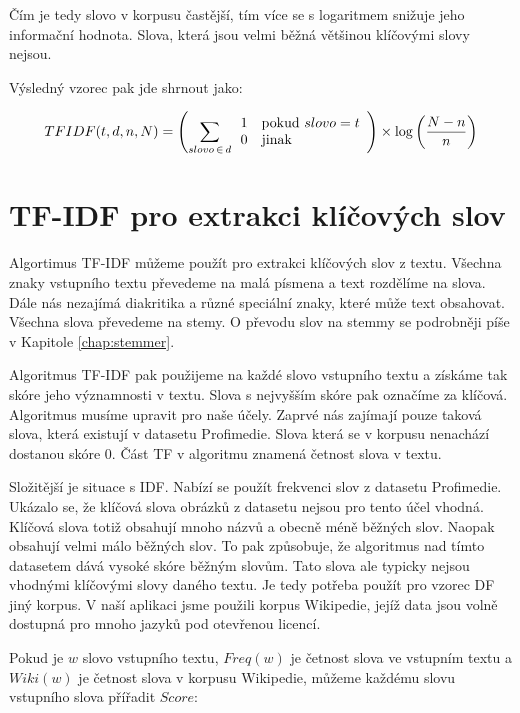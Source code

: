 Čím je tedy slovo v korpusu častější, tím více se s logaritmem snižuje jeho informační hodnota. Slova, která jsou velmi běžná většinou klíčovými slovy nejsou.

Výsledný vzorec pak jde shrnout jako:

\begin{equation}
TFIDF(t,d,n,N)= \left(\sum_{slovo\,\in\,d} \begin{array}{l l} 1 & \mathrm{pokud}\ slovo = t \\
  0 & \mathrm{jinak} \end{array}\right)
  \times
  \log \left(\frac{N - n}{n}\right)
\end{equation}

\section{TF-IDF pro extrakci klíčových slov}
\label{sec:keywords_extraction}

Algortimus TF-IDF můžeme použít pro extrakci klíčových slov z textu. Všechna znaky vstupního textu převedeme na malá písmena a text rozdělíme na slova. Dále nás nezajímá diakritika a různé speciální znaky, které může text obsahovat. Všechna slova převedeme na stemy. O převodu slov na stemmy se podrobněji píše v Kapitole \ref{chap:stemmer}.

Algoritmus TF-IDF pak použijeme na každé slovo vstupního textu a získáme tak skóre jeho významnosti v textu. Slova s nejvyšším skóre pak označíme za klíčová. Algoritmus musíme upravit pro naše účely. Zaprvé nás zajímají pouze taková slova, která existují v datasetu Profimedie. Slova která se v korpusu nenachází dostanou skóre 0. Část TF v algoritmu znamená četnost slova v textu.

Složitější je situace s IDF. Nabízí se použít frekvenci slov z datasetu Profimedie. Ukázalo se, že klíčová slova obrázků z datasetu nejsou pro tento účel vhodná. Klíčová slova totiž obsahují mnoho názvů a obecně méně běžných slov. Naopak obsahují velmi málo běžných slov. To pak způsobuje, že algoritmus nad tímto datasetem dává vysoké skóre běžným slovům. Tato slova ale typicky nejsou vhodnými klíčovými slovy daného textu. Je tedy potřeba použít pro vzorec DF jiný korpus. V naší aplikaci jsme použili korpus Wikipedie, jejíž data jsou volně dostupná pro mnoho jazyků pod otevřenou licencí.

Pokud je $w$ slovo vstupního textu, $Freq(w)$ je četnost slova ve vstupním textu a $Wiki(w)$ je četnost slova v korpusu Wikipedie, můžeme každému slovu vstupního slova přířadit $Score$:


